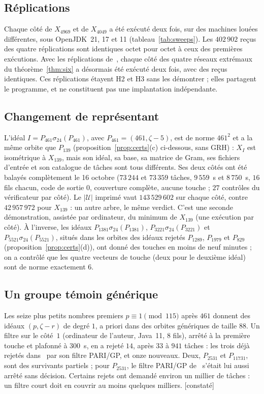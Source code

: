 \documentclass[11pt,a4paper]{amsart}
\theoremstyle{plain}
\theoremstyle{definition}
\newcommand{\Uc}{\mathcal{U}}
\newcommand{\st}[1]{\textup{\textsf{\small[#1]}}}
\newcommand{\CONS}{\st{constaté}}
\begin{document}
\subsection{Réplications}
Chaque côté de $X_{4969}$ et de $X_{4049}$ a été exécuté deux fois, sur des machines louées différentes, sous OpenJDK~21, 17 et 11 (tableau~\ref{tab:sweeps}). Les $402\,902$ reçus des quatre réplications sont identiques octet pour octet à ceux des premières exécutions. Avec les réplications de~\cite{Gau26}, chaque côté des quatre réseaux extrémaux du théorème~\ref{thm:six} a désormais été exécuté deux fois, avec des reçus identiques. Ces réplications étayent H2 et H3 sans les démontrer ; elles partagent le programme, et ne constituent pas une implantation indépendante.

\subsection{Changement de représentant}
L'idéal $I=P_{461}\sigma_{24}(P_{461})$, avec $P_{461}=(461,\zeta-5)$, est de norme $461^2$ et a la même orbite que $P_{139}$ (proposition~\ref{prop:certs}(c) ci-dessous, sans GRH) : $X_I$ est isométrique à $X_{139}$, mais son idéal, sa base, sa matrice de Gram, ses fichiers d'entrée et son catalogue de tâches sont tous différents. Ses deux côtés ont été balayés complètement le 16 octobre ($73\,244$ et $73\,359$ tâches, $9\,559$~s et $8\,750$~s, $16$ fils chacun, code de sortie $0$, couverture complète, aucune touche ; $27$ contrôles du vérificateur par côté). Le $|\Uc|$ imprimé vaut $143\,529\,602$ sur chaque côté, contre $42\,957\,972$ pour $X_{139}$ : un autre arbre, le même verdict. C'est une seconde démonstration, assistée par ordinateur, du minimum de $X_{139}$ (une exécution par côté). À l'inverse, les idéaux $P_{1381}\sigma_{24}(P_{1381})$, $P_{3221}\sigma_{24}(P_{3221})$ et $P_{5521}\sigma_{24}(P_{5521})$, situés dans les orbites des idéaux rejetés $P_{1289}$, $P_{1979}$ et $P_{829}$ (proposition~\ref{prop:certs}(d)), ont donné des touches en moins de neuf minutes ; on a contrôlé que les quatre vecteurs de touche (deux pour le deuxième idéal) sont de norme exactement $6$.

\subsection{Un groupe témoin générique}
Les seize plus petits nombres premiers $p\equiv1\pmod{115}$ après $461$ donnent des idéaux $(p,\zeta-r)$ de degré $1$, a priori dans des orbites génériques de taille $88$. Un filtre sur le côté~$1$ (ordinateur de l'auteur, Java~11, $8$ fils), arrêté à la première touche et plafonné à $300$~s, en a rejeté $14$, après $33$ à $941$ tâches : les trois déjà rejetés dans~\cite{Gau26} par son filtre PARI/GP, et onze nouveaux. Deux, $P_{2531}$ et $P_{11731}$, sont des survivants partiels ; pour $P_{2531}$, le filtre PARI/GP de~\cite{Gau26} s'était lui aussi arrêté sans décision. Certains rejets ont demandé environ un millier de tâches : un filtre court doit en couvrir au moins quelques milliers. \CONS
\end{document}
